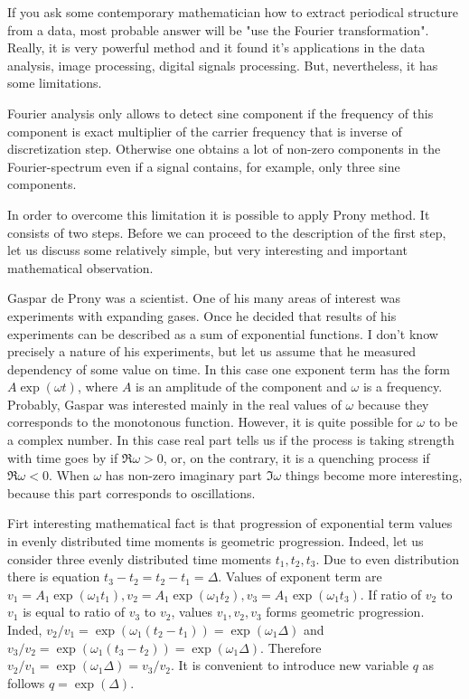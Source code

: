 \documentclass[14pt]{extarticle}
\begin{document}
If you ask some contemporary mathematician how to extract
periodical structure from a data, most probable answer will
be "use the Fourier transformation". Really, it is very
powerful method and it found it's applications in the
data analysis, image processing, digital signals processing.
But, nevertheless, it has some limitations.

Fourier analysis only allows to detect sine component if
the frequency of this component is exact multiplier
of the carrier frequency that is inverse of discretization
step. Otherwise one obtains a lot of non-zero components
in the Fourier-spectrum even if a signal contains, for example,
only three sine components.

In order to overcome this limitation it is possible to apply
Prony method. It consists of two steps. Before we can proceed
to the description of the first step, let us discuss some relatively
simple, but very interesting and important mathematical observation.

Gaspar de Prony was a scientist. One of his many areas of interest was
experiments with expanding gases. Once he decided that results of his
experiments can be described as a sum of exponential functions. I don't
know precisely a nature of his experiments, but let us assume that he
measured dependency of some value on time. In this case one exponent term
has the form $A\exp(\omega t)$, where $A$ is an amplitude of the component and
$\omega$ is a frequency. Probably, Gaspar was interested mainly in the real
values of $\omega$ because they corresponds to the monotonous function.
However, it is quite possible for $\omega$ to be a complex number. In this case
real part tells us if the process is taking strength with time goes by if \(\Re \omega > 0\), or,
on the contrary, it is a quenching process if \(\Re \omega < 0\). When \(\omega\)
has non-zero imaginary part $\Im \omega$ things become more interesting, because
this part corresponds to oscillations.

Firt interesting mathematical fact is that progression of exponential term values in evenly distributed time moments
is geometric progression. Indeed, let us consider three evenly distributed time moments 
$t_1, t_2, t_3$. Due to even distribution there is equation $t_3 - t_2 = t_2 - t_1 = \Delta$.
Values of exponent term are \(v_1 = A_1\exp(\omega_1 t_1), v_2 = A_1\exp(\omega_1 t_2), v_3 = A_1\exp(\omega_1 t_3)\).
If ratio of \(v_2\) to \(v_1\) is equal to ratio of \(v_3\) to \(v_2\), values \(v_1, v_2, v_3\) forms geometric progression.
Inded, \(v_2/v_1 = \exp(\omega_1(t_2 - t_1)) = \exp(\omega_1\Delta)\) and \(v_3/v_2 = \exp(\omega_1(t_3 - t_2)) = \exp(\omega_1\Delta)\).
Therefore \(v_2/v_1 = \exp(\omega_1\Delta) = v_3/v_2\). It is convenient to introduce
new variable \(q\) as follows \(q = \exp (\Delta)\).
\end{document}
